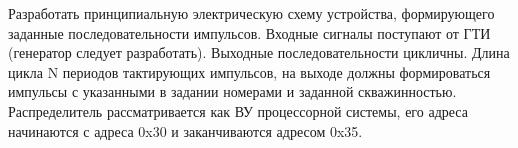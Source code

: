 Разработать принципиальную электрическую схему устройства, формирующего заданные последовательности импульсов. Входные сигналы поступают от ГТИ (генератор следует разработать). Выходные последовательности цикличны. Длина цикла N периодов тактирующих импульсов, на выходе должны формироваться импульсы с указанными в задании номерами и заданной скважинностью.
Распределитель рассматривается как ВУ процессорной системы, его адреса начинаются с адреса 0x30 и заканчиваются адресом 0x35.